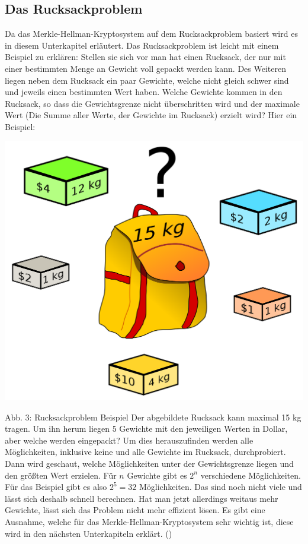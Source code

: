 \documentclass[a4paper,12pt,titlepage]{article}
\begin{document}
\subsection{Das Rucksackproblem}\label{rucksack}
Da das Merkle-Hellman-Kryptosystem auf dem Rucksackproblem basiert wird es in diesem Unterkapitel erläutert. \newline Das Rucksackproblem ist leicht mit einem Beispiel zu erklären: Stellen sie sich vor man hat einen Rucksack, der nur mit einer bestimmten Menge an Gewicht voll gepackt werden kann. Des Weiteren liegen neben dem Rucksack ein paar Gewichte, welche nicht gleich schwer sind und jeweils einen bestimmten Wert haben. Welche Gewichte kommen in den Rucksack, so dass die Gewichtsgrenze nicht überschritten wird und der maximale Wert (Die Summe aller Werte, der Gewichte im Rucksack) erzielt wird? \newline
Hier ein Beispiel:
\begin{center}
\includegraphics[scale=0.1]{rucksackproblem.png} %
\end{center}
Abb. 3: Rucksackproblem Beispiel
Der abgebildete Rucksack kann maximal 15 kg tragen. Um ihn herum liegen 5 Gewichte mit den jeweiligen Werten in Dollar, aber welche werden eingepackt? Um dies herauszufinden werden alle Möglichkeiten, inklusive keine und alle Gewichte im Rucksack, durchprobiert. Dann wird geschaut, welche Möglichkeiten unter der Gewichtsgrenze liegen und den größten Wert erzielen. Für $n$ Gewichte gibt es $2^{n}$ verschiedene Möglichkeiten. Für das Beispiel gibt es also $2^{5} = 32$ Möglichkeiten. Das sind noch nicht viele und lässt sich deshalb schnell berechnen. Hat man jetzt allerdings weitaus mehr Gewichte, lässt sich das Problem nicht mehr effizient lösen. Es gibt eine Ausnahme, welche für das Merkle-Hellman-Kryptosystem sehr wichtig ist, diese wird in den nächsten Unterkapiteln erklärt. (\cite{knapsack})
\end{document}
